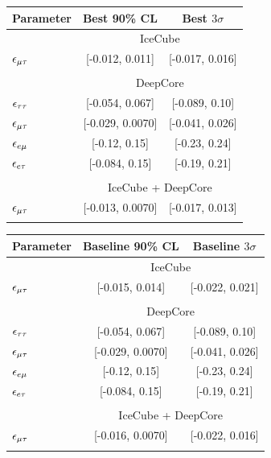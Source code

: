 {{\renewcommand{\arraystretch}{1.0}
 \begin{table}
   \begin{center}
      \begin{tabular}{lcc}
         \hline
         Parameter & Best 90\% CL & Best $3\sigma$\\
         \hline & \multicolumn{2}{c}{IceCube}  \\
         $\epsilon_{\mu\tau}$ &  [-0.012, 0.011] &  [-0.017, 0.016] \\\\
         & \multicolumn{2}{c}{DeepCore}\\ [0.3em]
         $\epsilon_{\tau\tau}$ &  [-0.054, 0.067] &  [-0.089, 0.10] \\
         $\epsilon_{\mu\tau}$ &  [-0.029, 0.0070] &  [-0.041, 0.026] \\
         $\epsilon_{e\mu}$ &  [-0.12, 0.15] &  [-0.23, 0.24] \\
         $\epsilon_{e\tau}$ &   [-0.084, 0.15] &  [-0.19, 0.21] \\\\
         &\multicolumn{2}{c}{IceCube + DeepCore} \\
         $\epsilon_{\mu\tau}$ &  [-0.013, 0.0070] &  [-0.017, 0.013] \\
         \hline
         \vspace{2em}
      \end{tabular}
      \begin{tabular}{lcc}
         \hline
         Parameter & Baseline 90\% CL & Baseline $3\sigma$ \\
         \hline & \multicolumn{2}{c}{IceCube}  \\
         $\epsilon_{\mu\tau}$ &  [-0.015, 0.014] &  [-0.022, 0.021] \\\\
         & \multicolumn{2}{c}{DeepCore}\\ [0.3em]
         $\epsilon_{\tau\tau}$ &  [-0.054, 0.067] &  [-0.089, 0.10] \\
         $\epsilon_{\mu\tau}$ &  [-0.029, 0.0070] &  [-0.041, 0.026] \\
         $\epsilon_{e\mu}$ &  [-0.12, 0.15] &  [-0.23, 0.24] \\
         $\epsilon_{e\tau}$ &   [-0.084, 0.15] &  [-0.19, 0.21] \\\\
         &\multicolumn{2}{c}{IceCube + DeepCore}\\
         $\epsilon_{\mu\tau}$ &  [-0.016, 0.0070] &  [-0.022, 0.016] \\
         \hline
         \vspace{2em}
      \end{tabular}

\end{center}
\end{table}}}
